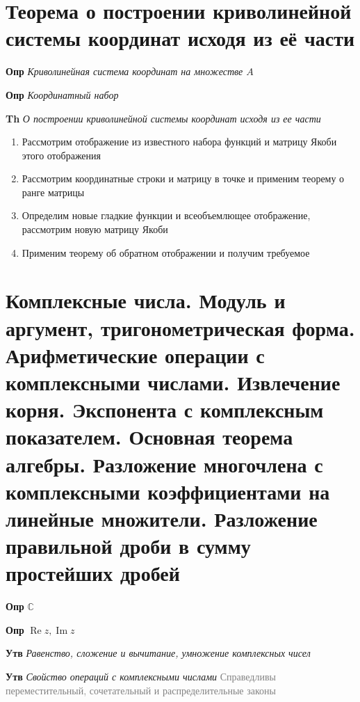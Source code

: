 \documentclass[a4paper, 14pt]{article}
\begin{document}
    \section{Теорема о построении криволинейной системы координат исходя из её части}
    
    \textbf{Опр} \textit{Криволинейная система координат на множестве $A$}
    
    \textbf{Опр} \textit{Координатный набор}
    
    \textbf{Th} \textit{О построении криволинейной системы координат исходя из ее части}
    
    \begin{enumerate}
        \item Рассмотрим отображение из известного набора функций и матрицу Якоби этого отображения
        \item Рассмотрим координатные строки и матрицу в точке и применим теорему о ранге матрицы
        \item Определим новые гладкие функции и всеобъемлющее отображение, рассмотрим новую матрицу Якоби
        \item Применим теорему об обратном отображении и получим требуемое
    \end{enumerate}
    
    \section{Комплексные числа.
    Модуль и аргумент, тригонометрическая форма.
    Арифметические операции с комплексными числами.
    Извлечение корня.
    Экспонента с комплексным показателем.
    Основная теорема алгебры.
    Разложение многочлена с комплексными коэффициентами на линейные множители.
    Разложение правильной дроби в сумму простейших дробей}

    
    \textbf{Опр} \textit{$\mathbb{C}$}
    
    \textbf{Опр} \textit{$\operatorname{Re}z, \operatorname{Im}z$}
    
    \textbf{Утв} \textit{Равенство, сложение и вычитание, умножение комплексных чисел}
    
    \textbf{Утв} \textit{Свойство операций с комплексными числами} \textcolor{gray}{Справедливы переместительный,
        сочетательный и распределительные законы}
    
\end{document}
